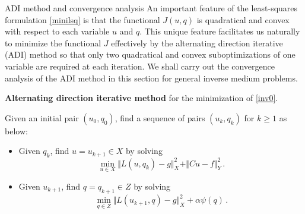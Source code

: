 \documentclass[11pt]{article}%
\renewcommand{\_}{{\fontfamily{ptm}\selectfont\textunderscore}}
\theoremstyle{plain}
\numberwithin{equation}{section}
\begin{document}
\begin{section}{ADI method and convergence analysis}\label{sec:ADI}
An important feature of the least-squares formulation \eqref{minilsq} is that the functional $J(u,q)$ is quadratical 
and convex with respect to each variable $u$ and $q$. 
This unique feature facilitates us naturally to minimize the functional $J$ effectively by the alternating direction iterative (ADI) 
method \cite{CsiszarAM1984, byrne2014iterative} so that only two quadratical and convex suboptimizations of one variable are required at each iteration. 
We shall carry out the convergence analysis of the ADI method in this section for general inverse medium problems.

\medskip
{\bf Alternating direction iterative method} for the minimization of \eqref{inv0}.

Given an initial pair $(u_0, q_0)$, find a sequence of pairs 
$(u_k, q_k)$ for $k\ge 1$ as below: 
\begin{itemize}
\item Given $q_k$, find $u=u_{k+1}\in X$ by solving 
\begin{equation}  \label{A-1}
\min_{u\in X} \Vert  L(u,q_k)- g\Vert_{X}^2+\Vert Cu-f\Vert_{Y}^2\,.
\end{equation}
\item  Given $u_{k+1}$, find $q=q_{k+1}\in Z$ by solving 
\begin{equation}  \label{A-2}
\min_{q\in Z} \Vert L(u_{k+1},q)- g\Vert_{X}^2+\alpha\psi(q)\,.
\end{equation}
\end{itemize}


\end{section}
\end{document}
